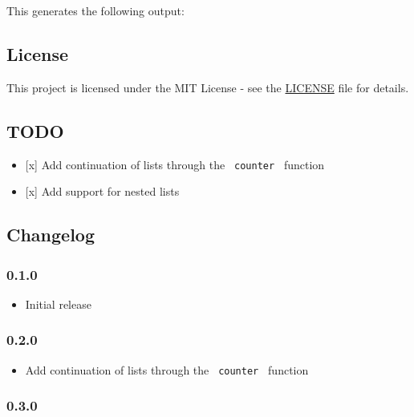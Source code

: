 This generates the following output:


\subsection{License}\label{license}

This project is licensed under the MIT License - see the
\href{https://github.com/typst/packages/raw/main/packages/preview/efilrst/0.3.0/LICENSE}{LICENSE}
file for details.

\subsection{TODO}\label{todo}

\begin{itemize}
\tightlist
\item
  {[}x{]} Add continuation of lists through the \texttt{\ counter\ }
  function
\item
  {[}x{]} Add support for nested lists
\end{itemize}

\subsection{Changelog}\label{changelog}

\subsubsection{0.1.0}\label{section}

\begin{itemize}
\tightlist
\item
  Initial release
\end{itemize}

\subsubsection{0.2.0}\label{section-1}

\begin{itemize}
\tightlist
\item
  Add continuation of lists through the \texttt{\ counter\ } function
\end{itemize}

\subsubsection{0.3.0}\label{section-2}

